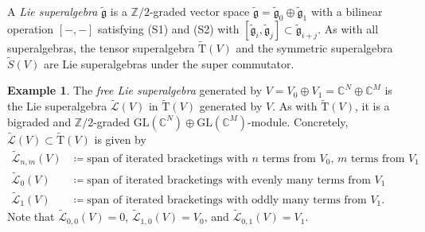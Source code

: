 \documentclass[11pt]{article}
\theoremstyle{definition}
\newtheorem{exam}[theo]{Example}
\numberwithin{equation}{section}
\newcommand\CC{\mathbb{C}}
\newcommand\ZZ{\mathbb{Z}}
\newcommand{\fgtil}{\widetilde{\mathfrak{g}}}
\newcommand\GL{\mathrm{GL}}
\newcommand\Trm{\mathrm{T}}
\newcommand\Ltil{\widetilde{\mathcal{L}}}
\newcommand\Stil{\widetilde{S}}
\newcommand\Trmtil{\widetilde{\Trm}}
\begin{document}
A \emph{Lie superalgebra} $\fgtil$ is a $\ZZ/2$-graded vector space $\fgtil = \fgtil_0 \oplus \fgtil_1$ with a bilinear operation $[-, -]$ satisfying (S1) and (S2) with $[\fgtil_i, \fgtil_j] \subset \fgtil_{i+j}$. As with all superalgebras, the tensor superalgebra $\Trmtil(V)$ and the symmetric superalgebra $\Stil(V)$ are Lie superalgebras under the super commutator.

\begin{exam}
    The \textit{free Lie superalgebra} generated by $V = V_0 \oplus V_1 = \CC^N \oplus \CC^M$ is the Lie superalgebra $\Ltil(V)$ in $\Trmtil(V)$ generated by $V$. As with $\Trmtil(V)$, it is a bigraded and $\ZZ/2$-graded $\GL(\CC^N) \oplus \GL(\CC^M)$-module. Concretely, $\Ltil(V) \subset \Trmtil(V)$ is given by
    \begin{align*}
        \Ltil_{n, m}(V) &\coloneqq \text{span of iterated bracketings with $n$ terms from $V_0$, $m$ terms from $V_1$} \\
        \Ltil_0(V) &\coloneqq \text{span of iterated bracketings with evenly many terms from $V_1$} \\
        \Ltil_1(V) &\coloneqq \text{span of iterated bracketings with oddly many terms from $V_1$}.
    \end{align*}
    Note that $\Ltil_{0, 0}(V) = 0$, $\Ltil_{1, 0}(V) = V_0$, and $\Ltil_{0, 1}(V) = V_1$.
\end{exam}
\end{document}
